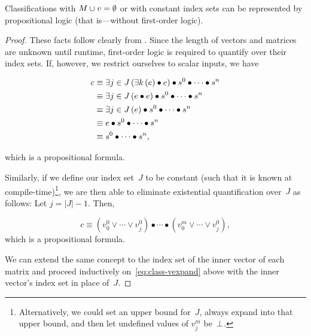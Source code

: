 \begin{corollary}
  Classifications with $M\cup v=\emptyset$ or with constant index sets can
    be represented by propositional logic
      (that is---without first-order logic).
\end{corollary}
\begin{proof}
  These facts follow clearly from .
  Since the length of vectors and matrices are unknown until runtime,
    first-order logic is required to quantify over their index sets.
  If, however, we restrict ourselves to scalar inputs,
    we have

    \begin{align*}
      c &\equiv \Exists{j\in J}{\Exists{k}{e}\bullet e}
                 \bullet\cpredscalar \\
        &\equiv \Exists{j\in J}{e \bullet e}
                 \bullet\cpredscalar \\
        &\equiv \Exists{j\in J}{e}
                 \bullet\cpredscalar \\
        &\equiv e \bullet\cpredscalar \\
        &\equiv \cpredscalar,
    \end{align*}

    \noindent
    which is a propositional formula.

  Similarly,
    if we define our index set~$J$ to be constant
      (such that it is known at compile-time)\footnote{%
        Alternatively,
          we could set an upper bound for~$J$,
          always expand into that upper bound,
          and then let undefined values of $v^m_j$ be~$\bot$.},
        we are then able to eliminate existential quantification over~$J$
        as follows:
  Let $j=|J|-1$.
  Then,

  \goodbreak
  \begin{equation}\label{eq:class-vexpand}
    c \equiv (v^0_0 \lor\cdots\lor v^0_j)
             \bullet\cdots\bullet
             (v^m_0 \lor\cdots\lor v^0_j),
  \end{equation}
  \noindent
  which is a propositional formula.

  We can extend the same concept to the index set of the inner vector of
    each matrix and proceed inductively on~\eqref{eq:class-vexpand} above
    with the inner vector's index set in place of~$J$.
\end{proof}

